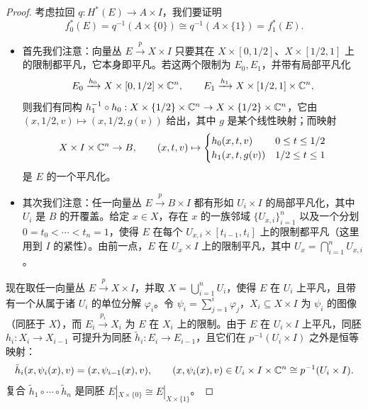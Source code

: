 \begin{proof}
考虑拉回 $q:H^*(E)\to A\times I$，我们要证明
\[
f_0^*(E)=q^{-1}(A\times\{0\})\cong q^{-1}(A\times\{1\})=f_1^*(E).
\]
\begin{itemize}[leftmargin=1.6em,itemsep=2pt]
\item 首先我们注意：向量丛 $E\xrightarrow{p}X\times I$ 只要其在 $X\times[0,1/2]$、$X\times[1/2,1]$ 上的限制都平凡，它本身即平凡。若这两个限制为 $E_0,E_1$，并带有局部平凡化
\[
E_0\xrightarrow{h_0}X\times[0,1/2]\times\mathbb{C}^n,\qquad E_1\xrightarrow{h_1}X\times[1/2,1]\times\mathbb{C}^n,
\]
则我们有同构 $h_1^{-1}\circ h_0:X\times\{1/2\}\times\mathbb{C}^n\to X\times\{1/2\}\times\mathbb{C}^n$，它由 $(x,1/2,v)\mapsto(x,1/2,g(v))$ 给出，其中 $g$ 是某个线性映射；而映射
\[
X\times I\times\mathbb{C}^n\to B,\qquad (x,t,v)\mapsto
\begin{cases}
h_0(x,t,v) & 0\le t\le 1/2\\
h_1(x,t,g(v)) & 1/2\le t\le 1
\end{cases}
\]
是 $E$ 的一个平凡化。
\item 其次我们注意：任一向量丛 $E\xrightarrow{p}B\times I$ 都有形如 $U_i\times I$ 的局部平凡化，其中 $U_i$ 是 $B$ 的开覆盖。给定 $x\in X$，存在 $x$ 的一族邻域 $\{U_{x,i}\}_{i=1}^n$ 以及一个分划 $0=t_0<\cdots<t_n=1$，使得 $E$ 在每个 $U_{x,i}\times[t_{i-1},t_i]$ 上的限制都平凡（这里用到 $I$ 的紧性）。由前一点，$E$ 在 $U_x\times I$ 上的限制平凡，其中 $U_x=\bigcap_{i=1}^n U_{x,i}$。
\end{itemize}

现在取任一向量丛 $E\xrightarrow{p}X\times I$，并取 $X=\bigcup_{i=1}^n U_i$，使得 $E$ 在 $U_i$ 上平凡，且带有一个从属于诸 $U_i$ 的单位分解 $\varphi_i$。令 $\psi_i=\sum_{j=1}^i\varphi_j$，$X_i\subseteq X\times I$ 为 $\psi_i$ 的图像（同胚于 $X$），而 $E_i\xrightarrow{p_i}X_i$ 为 $E$ 在 $X_i$ 上的限制。由于 $E$ 在 $U_i\times I$ 上平凡，同胚 $h_i:X_i\to X_{i-1}$ 可提升为同胚 $\tilde h_i:E_i\to E_{i-1}$，且它们在 $p^{-1}(U_i\times I)$ 之外是恒等映射：
\[
\tilde h_i(x,\psi_i(x),v)=(x,\psi_{i-1}(x),v),\qquad (x,\psi_i(x),v)\in U_i\times I\times\mathbb{C}^n\cong p^{-1}(U_i\times I).
\]
复合 $\tilde h_1\circ\cdots\circ\tilde h_n$ 是同胚 $E|_{X\times\{0\}}\cong E|_{X\times\{1\}}$。
\end{proof}

